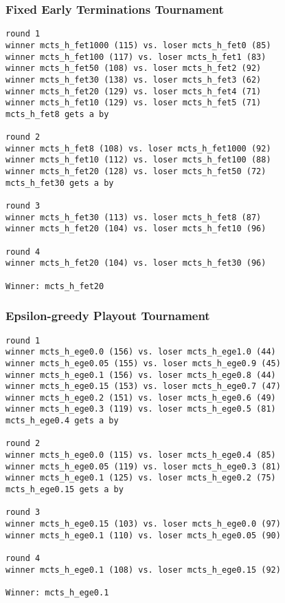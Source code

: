 \documentclass{article}
\begin{document}

\subsubsection{Fixed Early Terminations Tournament}

\begin{verbatim}
round 1
winner mcts_h_fet1000 (115) vs. loser mcts_h_fet0 (85)
winner mcts_h_fet100 (117) vs. loser mcts_h_fet1 (83)
winner mcts_h_fet50 (108) vs. loser mcts_h_fet2 (92)
winner mcts_h_fet30 (138) vs. loser mcts_h_fet3 (62)
winner mcts_h_fet20 (129) vs. loser mcts_h_fet4 (71)
winner mcts_h_fet10 (129) vs. loser mcts_h_fet5 (71)
mcts_h_fet8 gets a by

round 2
winner mcts_h_fet8 (108) vs. loser mcts_h_fet1000 (92)
winner mcts_h_fet10 (112) vs. loser mcts_h_fet100 (88)
winner mcts_h_fet20 (128) vs. loser mcts_h_fet50 (72)
mcts_h_fet30 gets a by

round 3
winner mcts_h_fet30 (113) vs. loser mcts_h_fet8 (87)
winner mcts_h_fet20 (104) vs. loser mcts_h_fet10 (96)

round 4
winner mcts_h_fet20 (104) vs. loser mcts_h_fet30 (96)

Winner: mcts_h_fet20
\end{verbatim}

\subsubsection{Epsilon-greedy Playout Tournament}

\begin{verbatim}
round 1
winner mcts_h_ege0.0 (156) vs. loser mcts_h_ege1.0 (44)
winner mcts_h_ege0.05 (155) vs. loser mcts_h_ege0.9 (45)
winner mcts_h_ege0.1 (156) vs. loser mcts_h_ege0.8 (44)
winner mcts_h_ege0.15 (153) vs. loser mcts_h_ege0.7 (47)
winner mcts_h_ege0.2 (151) vs. loser mcts_h_ege0.6 (49)
winner mcts_h_ege0.3 (119) vs. loser mcts_h_ege0.5 (81)
mcts_h_ege0.4 gets a by

round 2
winner mcts_h_ege0.0 (115) vs. loser mcts_h_ege0.4 (85)
winner mcts_h_ege0.05 (119) vs. loser mcts_h_ege0.3 (81)
winner mcts_h_ege0.1 (125) vs. loser mcts_h_ege0.2 (75)
mcts_h_ege0.15 gets a by

round 3
winner mcts_h_ege0.15 (103) vs. loser mcts_h_ege0.0 (97)
winner mcts_h_ege0.1 (110) vs. loser mcts_h_ege0.05 (90)

round 4
winner mcts_h_ege0.1 (108) vs. loser mcts_h_ege0.15 (92)

Winner: mcts_h_ege0.1
\end{verbatim}
\end{document}
